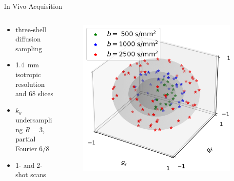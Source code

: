 \documentclass[hyperref={colorlinks=true,linkcolor=blue}, aspectratio=169]{beamer}
\begin{document}
	\begin{frame}{In Vivo Acquisition}
		\begin{columns}
			\begin{column}{0.6\textwidth}
				\begin{itemize}
					\item three-shell diffusion sampling
					\item \SI{1.4}{mm} isotropic resolution and 68 slices
					\item $k_y$ undersampling $R = 3$, partial Fourier $6/8$
					\vspace{1em}
					\item 1- and 2-shot scans
				\end{itemize}
			\end{column}
			\begin{column}{0.4\textwidth}
				\begin{figure}
					\includegraphics[width=\columnwidth]{figures/spheres_b2500.png}
				\end{figure}
			\end{column}
		\end{columns}
	\end{frame}
\end{document}
